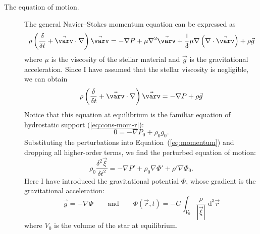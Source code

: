 \begin{description}
    \item[The equation of motion.] The general Navier--Stokes momentum equation can be expressed as
    \begin{equation} 
        \rho
        \left(
            \frac{\delta}{\delta t}
            +
            \vec{\varv}
            \cdot
            \nabla 
        \right)
        \vec{\varv}
        =
        -\nabla P
        +
        \mu \nabla^2 \vec{\varv}
        +
        \frac{1}{3} \mu \nabla\left(
            \nabla \cdot \vec{\varv}
        \right)
        +
        \rho \vec{g}
    \end{equation}
    where $\mu$ is the viscosity of the stellar material and $\vec{g}$ is the gravitational acceleration.
    Since I have assumed that the stellar viscosity is negligible, we can obtain 
    \begin{equation} \label{eq:momentum} %
        \rho
        \left(
            \frac{\delta}{\delta t}
            +
            \vec{\varv}
            \cdot
            \nabla 
        \right)
        \vec{\varv}
        =
        -
        \nabla P
        +
        \rho \vec g%
    \end{equation}
    Notice that this equation at equilibrium is the familiar equation of hydrostatic support (\ref{eq:cons-mom-r}):
    \begin{equation}
        0 = -\nabla P_0 + \rho_0 g_0.
    \end{equation}
    Substituting the perturbations into Equation~(\ref{eq:momentum}) and dropping all higher-order terms, we find the perturbed equation of motion:
    \begin{equation} \label{eq:perturbed-motion} \boxed{
        \rho_0
        \frac{\delta^2 \vec\xi}{\delta t^2}
        =
        -\nabla P'
        +
        \rho_0 \nabla \Phi'
        +
        \rho' \nabla \Phi_0.
    }\end{equation}
    Here I have introduced the gravitational potential $\Phi$, whose gradient is the gravitational acceleration: %
    \begin{equation}
        \vec g 
        =
        - \nabla \Phi
        \qquad
        \text{and}
        \qquad
        \Phi(\vec r, t)
        =
        -G
        \int_{V_0}
            \frac{\rho}{|\vec\xi|}
        \;\text{d}^3 \vec r
    \end{equation}
    where $V_0$ is the volume of the star at equilibrium. 
    

\end{description}
